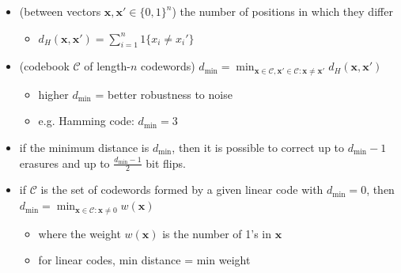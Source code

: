 \documentclass[10pt, landscape]{article}
\begin{document}
\begin{multicols*}{4}
  \begin{itemize}
    \item {} (between vectors $\mathbf{x}, \mathbf{x}' \in \{0, 1\}^n$) the number of positions in which they differ
      \begin{itemize}
        \item $d_H(\mathbf{x}, \mathbf{x}') = \sum^n_{i=1} 1\{x_i \neq x_i'\}$
      \end{itemize}
    \item {} (codebook $\mathcal{C}$ of length-$n$ codewords)
      \( {\displaystyle{ d_{\min} = \min_{\mathbf{x} \in \mathcal{C}, \mathbf{x}' \in \mathcal{C}: \mathbf{x} \neq \mathbf{x}'} d_H (\mathbf{x}, \mathbf{x'}) }} \) 
      \begin{itemize}
        \item higher $d_{\min}$ = better robustness to noise
        \item e.g. Hamming code: $d_{\min} = 3$
      \end{itemize}
    \item if the minimum distance is $d_{\min}$, then it is possible to correct up to $d_{\min} - 1$ erasures and up to $\frac{d_{\min}-1}{2}$ bit flips.
    \item if $\mathcal{C}$ is the set of codewords formed by a given linear code with $d_{\min} = 0$, then  \( {\displaystyle{ d_{\min} = \min_{\mathbf{x} \in \mathcal{C}: \mathbf{x} \neq 0} w(\mathbf{x}) }} \) 
      \begin{itemize}
        \item where the weight $w(\mathbf{x})$ is the number of 1's in $\mathbf{x}$
        \item for linear codes, min distance = min weight
      \end{itemize}
  \end{itemize}





\end{multicols*}
\end{document}
